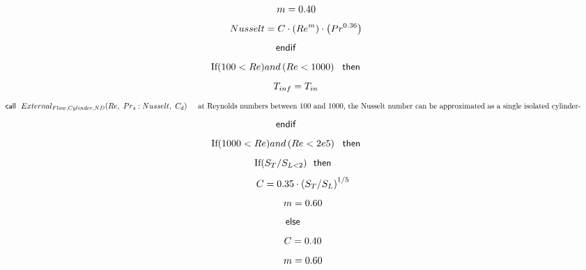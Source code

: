 \documentclass[10pt,fleqn]{article}
\newcommand{\F}[1]{\mbox{$#1$}}
\newcommand{\K}[1]{\mbox{\sf#1\ \ \mit}}
\newcommand{\KS}[1]{\mbox{\sf\ \ #1\ \ \mit}}
\newcommand{\V}[1]{\mbox{$ #1 $}}
\newcommand{\I}{\mbox{\hspace{0.20in}}}
\begin{document}
\begin{equation}
\I \I \label{EES Eqn:254}
m=0.40 
\end{equation}
\begin{equation}
\I \I \label{EES Eqn:255}
\V{Nusselt} =C\cdot  \left( \V{Re} ^{m} \right) \cdot  \left( \V{Pr} ^{0.36} \right)  
\end{equation}
\begin{equation}
\I \label{EES Eqn:256}
\K{endif} 
\end{equation}
\begin{equation}
\I \label{EES Eqn:257}
\mbox{If}{ \left( 100<\V{Re}  \right) } \V{and}   \left( \V{Re<1000}  \right)  \KS{then} 
\end{equation}
\begin{equation}
\I \I \label{EES Eqn:258}
T_{inf}=T_{in} 
\end{equation}
\begin{equation}
\I \I \label{EES Eqn:259}
\K{call} \F{External_{Flow,Cylinder,ND}}{ \left( \V{Re} ,\ \V{Pr} _{s}:\V{Nusselt} ,\ C_{d} \right) } 
\mbox{\I at Reynolds numbers between 100 and 1000, the Nusselt number can be approximated as a single isolated cylinder-}
\end{equation}
\begin{equation}
\I \label{EES Eqn:260}
\K{endif} 
\end{equation}
\begin{equation}
\I \label{EES Eqn:261}
\mbox{If}{ \left( 1000<\V{Re}  \right) } \V{and}   \left( \V{Re<2e5}  \right)  \KS{then} 
\end{equation}
\begin{equation}
\I \I \label{EES Eqn:262}
\mbox{If}{ \left( S_{T}/S_{L<2} \right) } \KS{then} 
\end{equation}
\begin{equation}
\I \I \I \label{EES Eqn:263}
C=0.35\cdot  \left( S_{T}/S_{L} \right) ^{1/5} 
\end{equation}
\begin{equation}
\I \I \I \label{EES Eqn:264}
m=0.60 
\end{equation}
\begin{equation}
\I \I \label{EES Eqn:265}
\K{else} 
\end{equation}
\begin{equation}
\I \I \I \label{EES Eqn:266}
C=0.40	 
\end{equation}
\begin{equation}
\I \I \I \label{EES Eqn:267}
m=0.60 
\end{equation}
\end{document}
